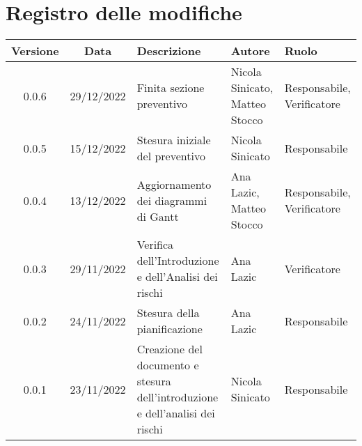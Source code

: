 \section*{Registro delle modifiche}
\begin{table}[H]
	\centering
	\renewcommand\tabularxcolumn[1]{>{\Centering}m{#1}}
	\begin{tabularx}{\textwidth}{| c | c | X | X | X |} 
	\hline
	\textbf{Versione} & \textbf{Data} & \textbf{Descrizione} & \textbf{Autore} & \textbf{Ruolo}\\
	\hline
	0.0.6 & 29/12/2022 & Finita sezione preventivo & Nicola Sinicato, Matteo Stocco & Responsabile, Verificatore\\
	\hline
	0.0.5 & 15/12/2022 & Stesura iniziale del preventivo & Nicola Sinicato & Responsabile\\
	\hline
	0.0.4 & 13/12/2022 & Aggiornamento dei diagrammi di Gantt & Ana Lazic, Matteo Stocco & Responsabile, Verificatore\\
	\hline
	0.0.3 & 29/11/2022 & Verifica dell'Introduzione e dell'Analisi dei rischi & Ana Lazic & Verificatore\\
	\hline
	0.0.2 & 24/11/2022 & Stesura della pianificazione & Ana Lazic & Responsabile\\
	\hline
	0.0.1 & 23/11/2022 & Creazione del documento e stesura dell'introduzione e dell'analisi dei rischi & Nicola Sinicato & Responsabile\\
 	\hline
	\end{tabularx}
\end{table}
